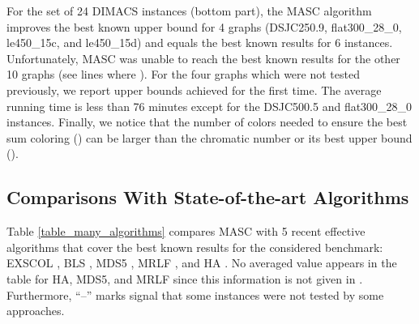 \documentclass{elsart}
\begin{document}
For the set of 24 DIMACS instances (bottom part), the MASC algorithm improves the best known upper bound for 4 graphs (DSJC250.9, flat300\_28\_0, le450\_15c, and le450\_15d) and equals the best known results for 6 instances. Unfortunately, MASC was unable to reach the best known results for the other 10 graphs (see lines where ). For the four graphs which were not tested previously, we report upper bounds achieved for the first time. The average running time is less than 76 minutes except for the DSJC500.5 and flat300\_28\_0 instances. Finally, we notice that the number of colors needed to ensure the best sum coloring () can be larger than the chromatic number or its best upper bound ().

\subsection{Comparisons With State-of-the-art Algorithms}
\label{subsec_comparison_results}

Table \ref{table_many_algorithms} compares MASC with 5 recent effective algorithms that cover the best known results for the considered benchmark: EXSCOL \cite{Wu&Hao2012}, BLS \cite{Benlic&Hao2012}, MDS5 \cite{Helmar&Chiarandini2011}, MRLF \cite{Li&al2009}, and HA \cite{Douiri&Elbernoussi2011}. No averaged value appears in the table for HA, MDS5, and MRLF since this information is not given in \cite{Douiri&Elbernoussi2011,Helmar&Chiarandini2011,Li&al2009}. Furthermore, ``--'' marks signal that some instances were not tested by some approaches.
\end{document}
